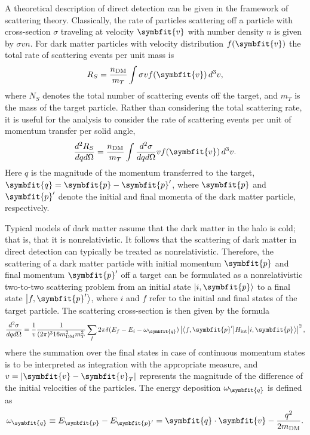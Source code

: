 \documentclass[b5paper, 10pt, twoside]{book}
\renewcommand{\vec}[1]{\symbfit{#1}}
\newcommand{\ddder}[3]{\frac{d^2#1}{d#2d#3}}
\newcommand{\difd}{\,d}
\newcommand{\ket}[1]{\left|#1\right\rangle}
\newcommand{\brakett}[3]{\left\langle#1\middle|#2\middle|#3\right\rangle}
\begin{document}
A theoretical description of direct detection can be given in the framework of scattering theory. Classically, the rate of particles scattering off a particle with cross-section $\sigma$ traveling at velocity $\vec{v}$ with number density $n$ is given by $\sigma vn$. For dark matter particles with velocity distribution $f(\vec{v})$ the total rate of scattering events per unit mass is
\begin{equation}
    R_S=\frac{n_\text{DM}}{m_T}\int\sigma vf(\vec{v})\difd^3v,
\end{equation}
where $N_S$ denotes the total number of scattering events off the target, and $m_T$ is the mass of the target particle. Rather than considering the total scattering rate, it is useful for the analysis to consider the rate of scattering events per unit of momentum transfer per solid angle,
\begin{equation}
    \ddder{R_S}{q}{\Omega}=\frac{n_\text{DM}}{m_T}\int\ddder{\sigma}{q}{\Omega}vf(\vec{v})\difd^3{v}.
\end{equation}
Here $q$ is the magnitude of the momentum transferred to the target, $\vec{q}=\vec{p}-\vec{p}'$, where $\vec{p}$ and $\vec{p}'$ denote the initial and final momenta of the dark matter particle, respectively.

Typical models of dark matter assume that the dark matter in the halo is cold; that is, that it is nonrelativistic. It follows that the scattering of dark matter in direct detection can typically be treated as nonrelativistic. Therefore, the scattering of a dark matter particle with initial momentum $\vec{p}$ and final momentum $\vec{p}'$ off a target can be formulated as a nonrelativistic two-to-two scattering problem from an initial state $\ket{i,\vec{p}}$ to a final state $\ket{f,\vec{p}'}$, where $i$ and $f$ refer to the initial and final states of the target particle. The scattering cross-section is then given by the formula
\begin{equation}
    \ddder{\sigma}{q}{\Omega}=\frac{1}{v}\frac{1}{(2\pi)^3 16m_\text{DM}^2m_T^2}\sum_f2\pi\delta(E_f-E_i-\omega_{\vec{q}})\left|\brakett{f,\vec{p}'}{H_\text{int}}{i,\vec{p}}\right|^2,
\end{equation}
where the summation over the final states in case of continuous momentum states is to be interpreted as integration with the appropriate measure, and $v=|\vec{v}-\vec{v}_T|$ represents the magnitude of the difference of the initial velocities of the particles. The energy deposition $\omega_{\vec{q}}$ is defined as
\begin{equation}
    \omega_{\vec{q}}\equiv E_{\vec{p}}-E_{\vec{p}'}=\vec{q}\cdot\vec{v}-\frac{q^2}{2m_\text{DM}}.
\end{equation}
\end{document}
